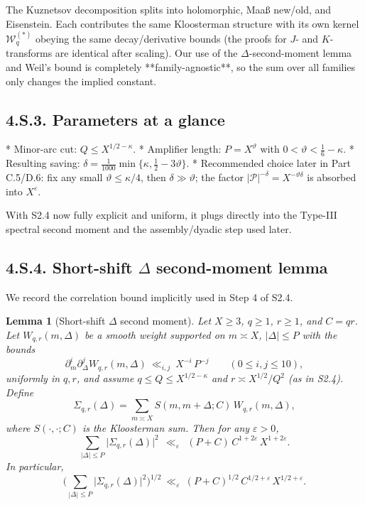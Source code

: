\documentclass[11pt]{article}
\newtheorem{lemma}{Lemma}[section]
\theoremstyle{definition}
\theoremstyle{remark}
\begin{document}
The Kuznetsov decomposition splits into holomorphic, Maaß new/old, and Eisenstein. Each contributes the same Kloosterman structure with its own kernel $\mathcal W_q^{(*)}$ obeying the same decay/derivative bounds (the proofs for $J$- and $K$-transforms are identical after scaling). Our use of the $\Delta$-second-moment lemma and Weil’s bound is completely **family-agnostic**, so the sum over all families only changes the implied constant.

\subsection*{4.S.3. Parameters at a glance}

* Minor-arc cut: $Q\le X^{1/2-\kappa}$.
* Amplifier length: $P=X^\vartheta$ with $0<\vartheta<\tfrac16-\kappa$.
* Resulting saving: $\delta=\frac1{1000}\min\{\kappa,\tfrac12-3\vartheta\}$.
* Recommended choice later in Part C.5/D.6: fix any small $\vartheta\le \kappa/4$, then $\delta\gg\vartheta$; the factor $|\mathcal P|^{-\delta}=X^{-\vartheta\delta}$ is absorbed into $X^\varepsilon$.

With S2.4 now fully explicit and uniform, it plugs directly into the Type-III spectral second moment and the assembly/dyadic step used later.

\subsection*{4.S.4. Short-shift $\Delta$ second-moment lemma}

We record the correlation bound implicitly used in Step 4 of S2.4.

\begin{lemma}[Short-shift $\Delta$ second moment]\label{lem:delta-second-moment}
Let $X\ge 3$, $q\ge 1$, $r\ge 1$, and $C=qr$. Let $W_{q,r}(m,\Delta)$ be a smooth weight supported on $m\asymp X$, $|\Delta|\le P$ with the bounds
\[
\partial_m^{i}\partial_\Delta^{j} W_{q,r}(m,\Delta)\ \ll_{i,j}\ X^{-i}\,P^{-j}
\qquad (0\le i,j\le 10),
\]
uniformly in $q,r$, and assume $q\le Q\le X^{1/2-\kappa}$ and $r\asymp X^{1/2}/Q^2$ (as in S2.4). Define
\[
\Sigma_{q,r}(\Delta)=\sum_{m\asymp X} S(m,m+\Delta;C)\,W_{q,r}(m,\Delta),
\]
where $S(\cdot,\cdot;C)$ is the Kloosterman sum. Then for any $\varepsilon>0$,
\[
\sum_{|\Delta|\le P} \big|\Sigma_{q,r}(\Delta)\big|^2\ \ \ll_{\varepsilon}\ \ (P+C)\,C^{1+2\varepsilon}\,X^{1+2\varepsilon}.
\]
In particular,
\[
\Big(\sum_{|\Delta|\le P} \big|\Sigma_{q,r}(\Delta)\big|^2\Big)^{1/2}
\ \ll_{\varepsilon}\ (P+C)^{1/2}\,C^{1/2+\varepsilon}\,X^{1/2+\varepsilon}.
\]
\end{lemma}
\end{document}
